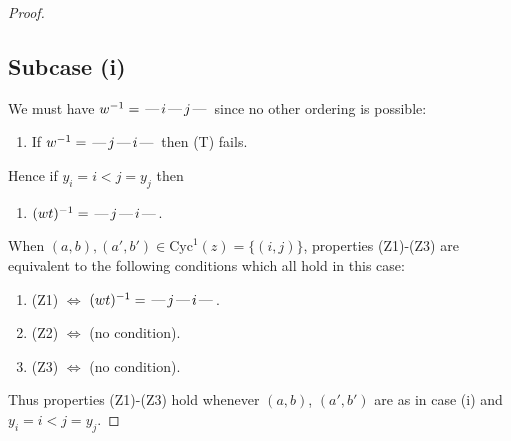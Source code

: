 \documentclass[10pt]{article}
\theoremstyle{definition}
\theoremstyle{definition}
\def\dash{\text{\hspace{0.5mm}---\hspace{0.5mm}}}
\def\Cyc{\mathrm{Cyc}}
\begin{document}
\begin{proof}
\subsection{Subcase (i)}
We must have $w^{-1} = \dash i\dash j\dash $
since no other ordering is possible:
\begin{enumerate}
\item If $w^{-1} = \dash j\dash i\dash $ then (T) fails.
\end{enumerate}
Hence if $y_i = i < j = y_j$ then \begin{enumerate}\item[] $(wt)^{-1} = \dash j\dash i\dash $. \end{enumerate}
When $(a,b),(a',b')\in\Cyc^1(z)= \{(i,j)\}$,
properties (Z1)-(Z3) are equivalent to the following conditions which all hold in this case:
\begin{enumerate}
\item[](Z1) $\Leftrightarrow$ $(wt)^{-1} = \dash j \dash i \dash$.
\item[](Z2) $\Leftrightarrow$ (no condition).
\item[](Z3) $\Leftrightarrow$ (no condition).
\end{enumerate}
Thus properties (Z1)-(Z3) hold whenever $(a,b)$, $(a',b')$ are as in case (i) and $y_i = i < j = y_j$.

\end{proof}
\end{document}
